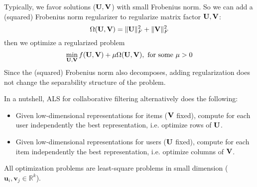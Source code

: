 \documentclass[../main.tex]{subfiles}
\begin{document}
\par Typically, we favor solutions (${\bf U,V}$) with small Frobenius norm. So we can add a (squared) Frobenius norm regularizer to regularize matrix factor ${\bf U,V}$:
\begin{equation*}
\Omega({\bf U,V})=\|{\bf U}\|_F^2 + \|{\bf V}\|_F^2
\end{equation*}
then we optimize a regularized problem
\begin{equation*}
\min_{{\bf U,V}} f({\bf U,V})+\mu\Omega({\bf U,V}),\ \text{for some }\mu>0
\end{equation*}
Since the (squared) Frobenius norm also decomposes, adding regularization does not change the separability structure of the problem.
\par In a nutshell, ALS for collaborative filtering alternatively does the following:
\begin{itemize}
	\item Given low-dimensional representations for items (${\bf V}$ fixed), compute for each user independently the best representation, i.e. optimize rows of ${\bf U}$.
	\item Given low-dimensional representations for users (${\bf U}$ fixed), compute for each item independently the best representation, i.e. optimize columns of ${\bf V}$.
\end{itemize}
All optimization problems are least-square problems in small dimension ($\bm{u}_i,\bm{v}_j\in \mathbb{R}^k$).
\end{document}
